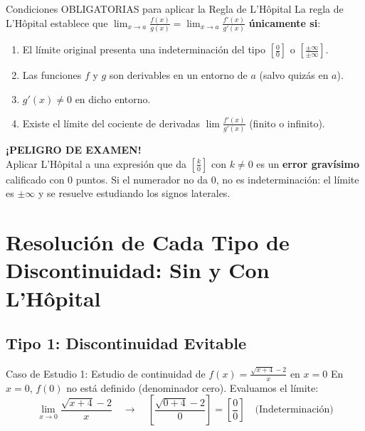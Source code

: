 \documentclass[10pt,a4paper]{article}
\begin{document}
\begin{trampa}{Condiciones OBLIGATORIAS para aplicar la Regla de L'Hôpital}
La regla de L'Hôpital establece que $\lim_{x \to a} \frac{f(x)}{g(x)} = \lim_{x \to a} \frac{f'(x)}{g'(x)}$ \textbf{únicamente si}:
\begin{enumerate}\itemsep 1.5pt
    \item El límite original presenta una indeterminación del tipo $\left[\frac{0}{0}\right]$ o $\left[\frac{\pm\infty}{\pm\infty}\right]$.
    \item Las funciones $f$ y $g$ son derivables en un entorno de $a$ (salvo quizás en $a$).
    \item $g'(x) \neq 0$ en dicho entorno.
    \item Existe el límite del cociente de derivadas $\lim \frac{f'(x)}{g'(x)}$ (finito o infinito).
\end{enumerate}
\vspace{1mm}
\textbf{¡PELIGRO DE EXAMEN!}\\
Aplicar L'Hôpital a una expresión que da $\left[\frac{k}{0}\right]$ con $k \neq 0$ es un \textbf{error gravísimo} calificado con 0 puntos. Si el numerador no da 0, no es indeterminación: el límite es $\pm\infty$ y se resuelve estudiando los signos laterales.
\end{trampa}

\newpage

\section{Resolución de Cada Tipo de Discontinuidad: Sin y Con L'Hôpital}

\subsection{Tipo 1: Discontinuidad Evitable}

\begin{ejemplobox}{Caso de Estudio 1: Estudio de continuidad de $f(x) = \frac{\sqrt{x+4} - 2}{x}$ en $x = 0$}
En $x = 0$, $f(0)$ no está definido (denominador cero). Evaluamos el límite:
$$\lim_{x \to 0} \frac{\sqrt{x+4} - 2}{x} \quad \longrightarrow \quad \left[\frac{\sqrt{0+4}-2}{0}\right] = \left[\frac{0}{0}\right] \quad \text{(Indeterminación)}$$
\end{ejemplobox}
\end{document}
